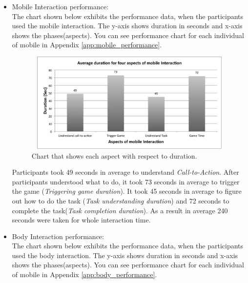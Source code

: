 \begin{itemize}

\item Mobile Interaction performance: \\
The chart shown below exhibits the performance data, when the participants used the mobile interaction.
The y-axis shows duration in seconds and x-axis shows the phases(aspects). You can see performance chart for each individual of mobile in Appendix \ref{app:mobile_performance}.




\begin{figure}[H]
\centering
\includegraphics[width=12cm,height=5cm]{Figures/6/mobile_average}%
 \caption{Chart that shows each aspect with respect to duration. }%
 \label{fig:mobile_average}%
\end{figure}

Participants took 49 seconds in average to understand \emph{Call-to-Action}. After participants understood what to do, it took 73 seconds in average to trigger the game (\emph{Triggering game duration}). It took 45 seconds in average to figure out how to do the task (\emph{Task understanding duration}) and 72 seconds to complete the task(\emph{Task completion duration}). As a result in average 240 seconds were taken for whole interaction time.
%


\item Body Interaction performance: \\
The chart shown below exhibits the performance data, when the participants used the body interaction.
The y-axis shows duration in seconds and x-axis shows the phases(aspects). You can see performance chart for each individual of mobile in Appendix \ref{app:body_performance}.


\end{itemize}
